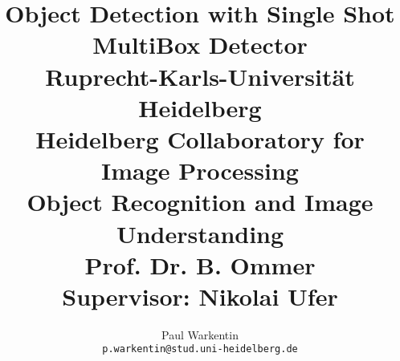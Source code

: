
\title{%
  {\LARGE \textbf{Object Detection with Single Shot MultiBox Detector}} \\[0.5cm]
  {\large Ruprecht-Karls-Universität Heidelberg} \\
  {\large Heidelberg Collaboratory for Image Processing} \\[0.5cm]
  {\large Object Recognition and Image Understanding} \\[-0.2cm]
  {\large Prof. Dr. B. Ommer} \\
  {\large Supervisor: Nikolai Ufer}
}

\author{%
  Paul Warkentin \\
  {\tt\small p.warkentin@stud.uni-heidelberg.de}
}

\maketitle
